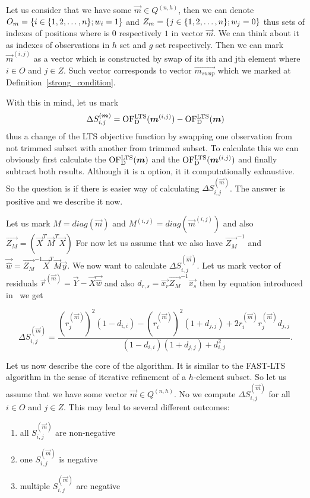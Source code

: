 Let us consider that we have some $\vec{m} \in Q^{(n,h)}$, then we can denote $O_m = \{{i \in  \{{  1,2,\ldots , n  \}} ;w_i = 1\}}$ and $Z_m = \{{j \in  \{{  1,2,\ldots , n  \}} ;w_j = 0\}}$ thus sets of indexes of positions where is $0$ respectively $1$ in vector $\vec{m}$. We can think about it as indexes of observations in $h$ set and $g$ set respectively. Then we can mark $\vec{m}^{(i,j)}$ as a vector which is constructed by swap of its ith and jth element where $i \in O$ and $j \in Z$. Such vector corresponds to vector $\vec{m_{swap}}$ which we marked at Definition~\ref{strong_condition}.

With this in mind, let us mark 
\begin{equation}
    \Delta S^{(\boldsymbol{m})}_{i,j} = \operatorname{OF^{LTS}_D}(\boldsymbol{m}^{(i,j)}) - \operatorname{OF^{LTS}_D}(\boldsymbol{m})
\end{equation}
thus a change of the LTS objective function by swapping one observation from not trimmed subset with another from trimmed subset. To calculate this we can obviously first calculate the  $\operatorname{OF^{LTS}_D}(\boldsymbol{m})$ and  the $ \operatorname{OF^{LTS}_D}(\boldsymbol{m}^{(i,j)})$ and finally subtract both results. Although it is a option, it it computationally exhaustive. So the question is if there is easier way of calculating $\Delta S^{(\vec{m})}_{i,j}$. The answer is positive and we describe it now.

Let us mark  
$M = diag(\vec{m})$ and 
$M^{(i,j)} = diag(\vec{m}^{(i,j)})$ and also
$\vec{Z_M} = (\vec{X}^T\vec{M}^T\vec{X})$
For now let us assume that we also have
$\vec{Z_M}^{-1}$ and $\vec{\hat{w}} = \vec{Z_M}^{-1}\vec{X}^T\vec{M}\vec{y}$.
We now want to calculate $\Delta S^{(\vec{m})}_{i,j}$.
Let us mark vector of residuals 
$\vec{r}^{(\vec{m})} = \vec{Y} - \vec{X} \vec{\hat{w}} $
and also $d_{r,s} = \vec{x_r} \vec{Z_M}^{-1}  \vec{x_s} $
then by equation introduced in~\cite{atkinson1991simulated} we get

\begin{equation} \label{hawkins:rovnice}
    \Delta S^{(\vec{m})}_{i,j} = 
    \frac{({r}^{(\vec{m})}_{j})^2(1-d_{i,i})- ({r}^{(\vec{m})}_{i})^2(1+d_{j,j}) + 2{r}^{(\vec{m})}_{i}{r}^{(\vec{m})}_{j}d_{j,j}}
    {(1-d_{i,i})(1+d_{j,j}) + d_{i,j}^2}.
\end{equation}

Let us now describe the core of the algorithm. It is similar to the FAST-LTS algorithm in the sense of iterative refinement of a $h$-element subset. So let us assume that we have some vector  $\vec{m} \in Q^{(n,h)}$. No we compute  $\Delta S^{(\vec{m})}_{i,j}$ for all $i \in O$ and $j \in Z$. This may lead to several different outcomes:
\begin{enumerate}
    \item all $S^{(\vec{m})}_{i,j}$ are non-negative
    \item one $S^{(\vec{m})}_{i,j}$ is negative
    \item multiple $S^{(\vec{m})}_{i,j}$ are negative
\end{enumerate}

